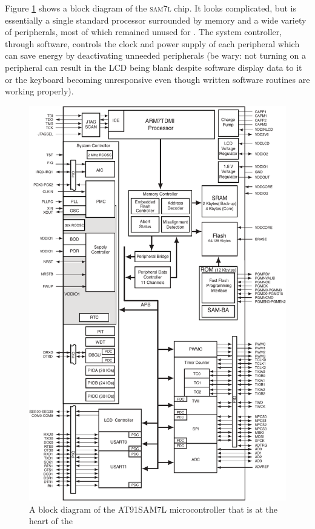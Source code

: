 \documentclass{LibHP20b}
\begin{document}
Figure \ref{fig:at91sam7l} shows a block diagram of the \textsc{sam7l} chip. It looks complicated, but is essentially a single standard processor surrounded by memory and a wide variety of peripherals, most of which remained unused for \HP. The system controller, through software, controls the clock and power supply of each peripheral which can save energy by deactivating unneeded peripherals (be wary: not turning on a peripheral can result in the LCD being blank despite software display data to it or the keyboard becoming unresponsive even though written software routines are working properly).

\begin{figure}
\centerline{\includegraphics[height=0.9\textheight]{AT91SAM7lBlockDiagram.pdf}}
\caption{A block diagram of the AT91SAM7L microcontroller that is at
  the heart of the }
\label{fig:at91sam7l}
\end{figure}
\end{document}
